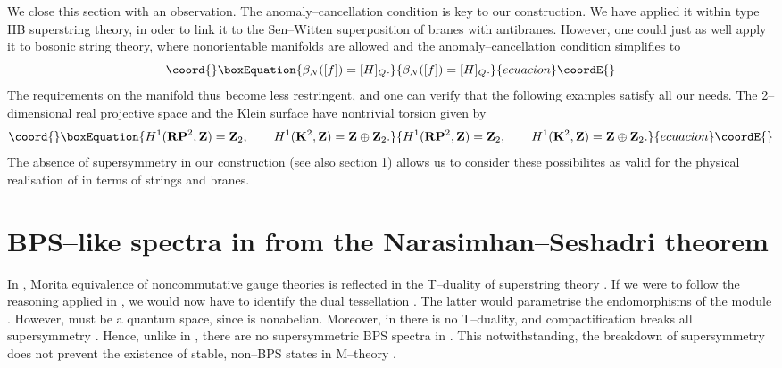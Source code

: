 \documentclass[a4paper,a4paper]{article}
\begin{document}
We close this section with an observation. The anomaly--cancellation 
condition is key to our construction. We have applied it within type 
IIB superstring theory, in oder to link it to the Sen--Witten 
superposition of branes with antibranes. However, one could just as well 
apply it to bosonic string theory, where nonorientable manifolds
are allowed and the anomaly--cancellation condition \cite{KAPUSTIN} 
simplifies to 
\begin{equation}\coord{}\boxEquation{  
\beta_N([f])=[H]_Q.  
\label{bosonicanomaly}
}{  
\beta_N([f])=[H]_Q.  
}{ecuacion}\coordE{}\end{equation}  
The requirements on the manifold \coordHE{} thus become less restringent,
and one can verify that the following examples satisfy all our needs.
The 2--dimensional real projective space \coordHE{}  and the Klein
surface \coordHE{} have nontrivial torsion given by
\begin{equation}\coord{}\boxEquation{
H^1({\bf RP}^2, {\bf Z})={\bf Z}_2, \qquad H^1({\bf K}^2, {\bf Z})={\bf 
Z}\oplus {\bf Z}_2.
\label{nontors}
}{
H^1({\bf RP}^2, {\bf Z})={\bf Z}_2, \qquad H^1({\bf K}^2, {\bf Z})={\bf 
Z}\oplus {\bf Z}_2.
}{ecuacion}\coordE{}\end{equation}
The absence of supersymmetry in our construction (see also section 
\ref{morgplus}) allows us to consider these possibilites as valid for 
the physical realisation of \coordHE{} in terms of 
strings and branes.

\section{BPS--like spectra in \coordHE{} from the Narasimhan--Seshadri theorem}
\label{morgplus}
  
In \coordHE{}, Morita equivalence of noncommutative gauge theories is reflected 
in the T--duality of superstring theory \cite{PIOLINE}. If we were to follow 
the reasoning applied in \coordHE{} \cite{SCHWARZ}, we would now have to identify 
the dual tessellation \coordHE{}. The latter would parametrise the  
endomorphisms \coordHE{} of the module \coordHE{}. However, 
\coordHE{} must be a quantum space, since \myHighlight{$\Gamma$}\coordHE{} is nonabelian.
Moreover, in \coordHE{} there is no T--duality, and compactification breaks 
all supersymmetry \cite{RUSSO}. Hence, unlike in \coordHE{}, there are no 
supersymmetric BPS spectra in \coordHE{}.  This notwithstanding, the breakdown 
of supersymmetry does not prevent the existence of stable, non--BPS states 
in M--theory \cite{WITTENDK, SEN}.  
 
\end{document}

